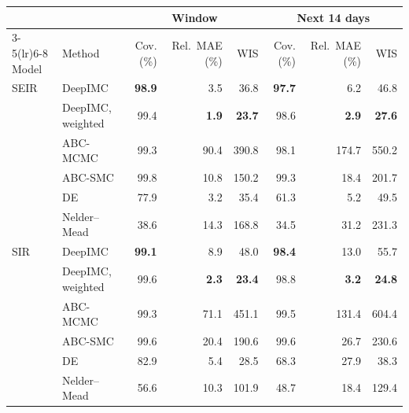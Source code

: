 \begin{tabular}{llrrrrrr}
\toprule
 &  & \multicolumn{3}{c}{Window} & \multicolumn{3}{c}{Next 14 days} \\
\cmidrule(lr){3-5}\cmidrule(lr){6-8}
Model & Method & Cov. (\%) & Rel.\ MAE (\%) & WIS & Cov. (\%) & Rel.\ MAE (\%) & WIS \\
\midrule
SEIR & DeepIMC & \textbf{98.9} & 3.5 & 36.8 & \textbf{97.7} & 6.2 & 46.8 \\
 & DeepIMC, weighted & 99.4 & \textbf{1.9} & \textbf{23.7} & 98.6 & \textbf{2.9} & \textbf{27.6} \\
 & ABC-MCMC & 99.3 & 90.4 & 390.8 & 98.1 & 174.7 & 550.2 \\
 & ABC-SMC & 99.8 & 10.8 & 150.2 & 99.3 & 18.4 & 201.7 \\
 & DE & 77.9 & 3.2 & 35.4 & 61.3 & 5.2 & 49.5 \\
 & Nelder--Mead & 38.6 & 14.3 & 168.8 & 34.5 & 31.2 & 231.3 \\
\midrule
SIR & DeepIMC & \textbf{99.1} & 8.9 & 48.0 & \textbf{98.4} & 13.0 & 55.7 \\
 & DeepIMC, weighted & 99.6 & \textbf{2.3} & \textbf{23.4} & 98.8 & \textbf{3.2} & \textbf{24.8} \\
 & ABC-MCMC & 99.3 & 71.1 & 451.1 & 99.5 & 131.4 & 604.4 \\
 & ABC-SMC & 99.6 & 20.4 & 190.6 & 99.6 & 26.7 & 230.6 \\
 & DE & 82.9 & 5.4 & 28.5 & 68.3 & 27.9 & 38.3 \\
 & Nelder--Mead & 56.6 & 10.3 & 101.9 & 48.7 & 18.4 & 129.4 \\
\bottomrule
\end{tabular}
